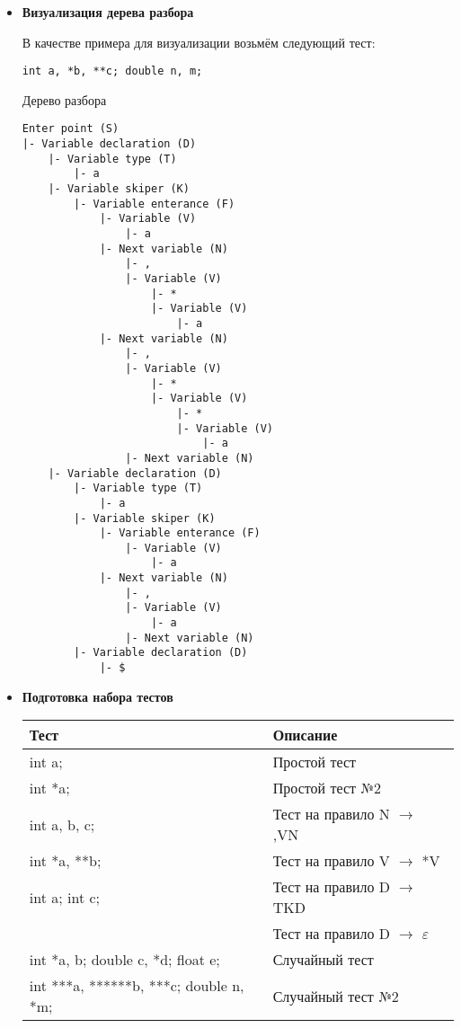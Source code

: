 \documentclass[12pt]{article}
\begin{document}
\begin{itemize}
    \item \textbf{Визуализация дерева разбора}

        В качестве примера для визуализации возьмём следующий тест:

        \begin{verbatim}				
int a, *b, **c; double n, m;
        \end{verbatim}				

        Дерево разбора
        \begin{verbatim}				
Enter point (S)
|- Variable declaration (D)
    |- Variable type (T)
        |- a
    |- Variable skiper (K)
        |- Variable enterance (F)
            |- Variable (V)
                |- a
            |- Next variable (N)
                |- ,
                |- Variable (V)
                    |- *
                    |- Variable (V)
                        |- a
            |- Next variable (N)
                |- ,
                |- Variable (V)
                    |- *
                    |- Variable (V)
                        |- *
                        |- Variable (V)
                            |- a
                |- Next variable (N)
    |- Variable declaration (D)
        |- Variable type (T)
            |- a
        |- Variable skiper (K)
            |- Variable enterance (F)
                |- Variable (V)
                    |- a
            |- Next variable (N)
                |- ,
                |- Variable (V)
                    |- a
                |- Next variable (N)
        |- Variable declaration (D)
            |- $
        \end{verbatim}				

    \item \textbf{Подготовка набора тестов}

        \begin{tabular} {|l|l|}
            \hline
                \textbf{Тест} & \textbf{Описание}\\
            \hline
                int a; & Простой тест \\
            \hline
                int *a; & Простой тест №2 \\
            \hline
                int a, b, c; & Тест на правило N $\rightarrow$ ,VN \\
            \hline
                int *a, **b; & Тест на правило V $\rightarrow$ *V \\
            \hline
                int a; int c; & Тест на правило D $\rightarrow$ TKD \\
            \hline
                  & Тест на правило D $\rightarrow$ $\varepsilon$ \\
            \hline
                int *a, b; double c, *d; float e; & Случайный тест \\
            \hline
                int ***a, ******b, ***c; double n, *m; & Случайный тест №2 \\
            \hline
        \end{tabular}


\end{itemize}
\end{document}
